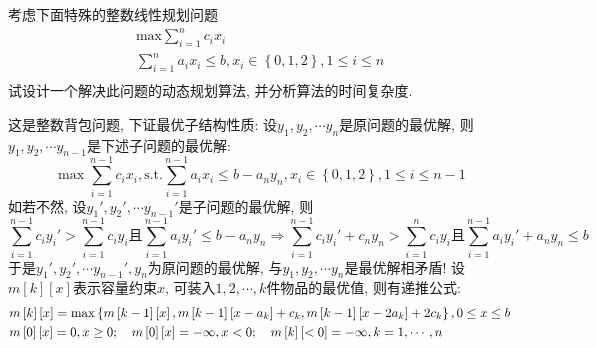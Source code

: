 \documentclass{article}
\begin{document}
\begin{homeworkProblem}
	考虑下面特殊的整数线性规划问题
	$$
	\begin{array}{l}
		\displaystyle \text{max}  \sum_{i=1}^n{c_ix_i}\\
		\displaystyle \sum_{i=1}^n{a_ix_i\le b, x_i\in \left\{ 0,1,2 \right\} ,1\le i\le n}\\
	\end{array}
	$$
	试设计一个解决此问题的动态规划算法, 并分析算法的时间复杂度.
	
	\solution 这是整数背包问题, 下证最优子结构性质: 设$y_1,y_2,\cdots y_n$是原问题的最优解, 则$y_1,y_2,\cdots y_{n-1}$是下述子问题的最优解:$$\max \sum_{i=1}^{n-1}{c_ix_i}, \text{s.t.} \sum_{i=1}^{n-1}{a_ix_i}\le b-a_ny_n,x_i\in \left\{ 0,1,2 \right\} ,1\le i\le n-1
	$$
	如若不然, 设$y_1',y_2',\cdots y_{n-1}'$是子问题的最优解, 则
	$$\sum_{i=1}^{n-1}{c_iy_i'}>\sum_{i=1}^{n-1}{c_iy_i}\text{且}\sum_{i=1}^{n-1}{a_iy_i'}\le b-a_ny_n\Rightarrow \sum_{i=1}^{n-1}{c_iy_i'}+c_ny_n>\sum_{i=1}^n{c_iy_i}\text{且}\sum_{i=1}^{n-1}{a_iy_i'}+a_ny_n\le b
	$$
	于是$y_1',y_2',\cdots y_{n-1}',y_n$为原问题的最优解, 与$y_1,y_2,\cdots y_n$是最优解相矛盾! 设$m[k][x]$表示容量约束$x$, 可装入$1,2,\cdots,k$件物品的最优值, 则有递推公式:
	\begin{align}
		&m\left[ k \right] \left[ x \right] =\max \left\{ m\left[ k-1 \right] \left[ x \right] ,m\left[ k-1 \right] \left[ x-a_k \right] +c_k,m\left[ k-1 \right] \left[ x-2a_k \right] +2c_k \right\} ,0\le x\le b \notag
		\\
		&m\left[ 0 \right] \left[ x \right] =0,x\ge 0;\quad m\left[ 0 \right] \left[ x \right] =-\infty ,x<0;\quad m\left[ k \right] \left[ <0 \right] =-\infty ,k=1,\cdots ,n \notag
	\end{align}
\end{homeworkProblem}

\pagebreak
\end{document}
